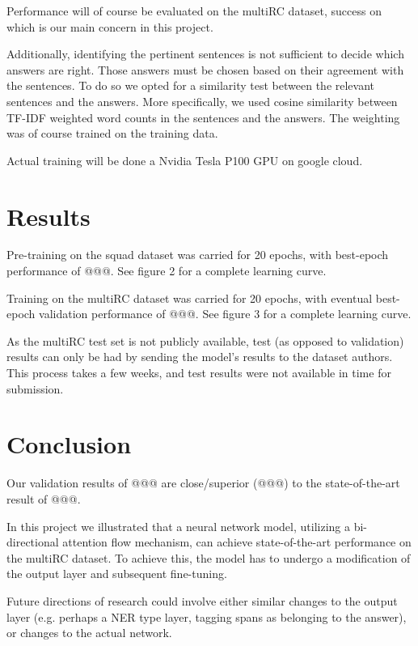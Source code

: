 \documentclass[12pt, a4paper]{article}
\begin{document}
\begin{multicols}{2}
			Performance will of course be evaluated on the multiRC dataset, success on which is our main concern in this project.
			
			Additionally, identifying the pertinent sentences is not sufficient to decide which answers are right. Those answers must be chosen based on their agreement with the sentences. To do so we opted for a similarity test between the relevant sentences and the answers. More specifically, we used cosine similarity between TF-IDF weighted word counts in the sentences and the answers. The weighting was of course trained on the training data.
			
			Actual training will be done a Nvidia Tesla P100 GPU on google cloud.
			
		\section{Results}
		
			Pre-training on the squad dataset was carried for 20 epochs, with best-epoch performance of @@@. See figure 2 for a complete learning curve.
			
			Training on the multiRC dataset was carried for 20 epochs, with eventual best-epoch validation performance of @@@. See figure 3 for a complete learning curve.
			
			As the multiRC test set is not publicly available, test (as opposed to validation) results can only be had by sending the model's results to the dataset authors. This process takes a few weeks, and test results were not available in time for submission.
			
		\section{Conclusion}
		
			Our validation results of @@@ are close/superior (@@@) to the state-of-the-art result of @@@.
		
			In this project we illustrated that a neural network model, utilizing a bi-directional attention flow mechanism, can achieve state-of-the-art performance on the multiRC dataset. To achieve this, the model has to undergo a modification of the output layer and subsequent fine-tuning.
			
			Future directions of research could involve either similar changes to the output layer (e.g. perhaps a NER type layer, tagging spans as belonging to the answer), or changes to the actual network.
		
	\end{multicols}
\end{document}
